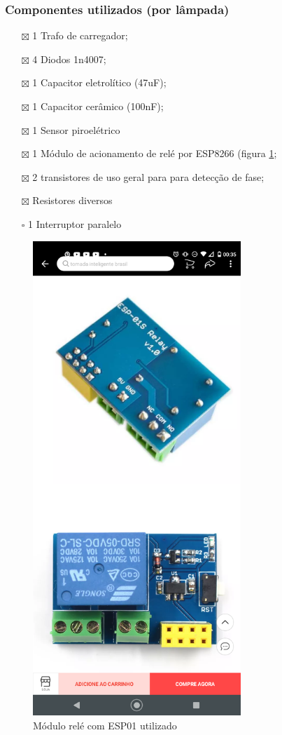 \documentclass[11pt]{article}
\begin{document}
\subsubsection{Componentes utilizados (por lâmpada)}
\label{sec:orgb9620a2}
\begin{itemize}
\item[{$\boxtimes$}] 1 Trafo de carregador;
\item[{$\boxtimes$}] 4 Diodos 1n4007;
\item[{$\boxtimes$}] 1 Capacitor eletrolítico (47uF);
\item[{$\boxtimes$}] 1 Capacitor cerâmico (100nF);
\item[{$\boxtimes$}] 1 Sensor piroelétrico
\item[{$\boxtimes$}] 1 Módulo de acionamento de relé por ESP8266 (figura \ref{fig:module_esp01};
\item[{$\boxtimes$}] 2 transistores de uso geral para para detecção de fase;
\item[{$\boxtimes$}] Resistores diversos
\item[{$\square$}] 1 Interruptor paralelo
\end{itemize}
\begin{figure}[h!]
\caption{\label{fig:module_esp01}Módulo relé com ESP01 utilizado}
\centering
\includegraphics[width=0.7\textwidth]{./module_esp01.png}
\end{figure}
\end{document}
